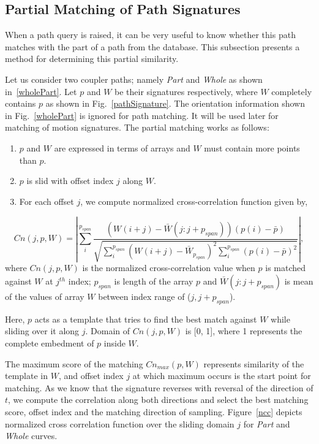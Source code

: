\documentclass[twocolumn,10pt]{asme2ej}
\begin{document}
\subsection{Partial Matching of Path Signatures}\label{sec_ncc}
When a path query is raised, it can be very useful to know whether this path matches with the part of a path from the database.
This subsection presents a method for determining this partial similarity.

Let us consider two coupler paths; namely \emph{Part} and \emph{Whole} as shown in~\ref{wholePart}.
Let $p$ and $W$ be their signatures respectively, where $W$ completely contains $p$ as shown in Fig.~\ref{pathSignature}.
The orientation information shown in Fig.~\ref{wholePart} is ignored for path matching. It will be used later for matching of motion signatures.
The partial matching works as follows:

\begin{enumerate}
  \item $p$ and $W$ are expressed in terms of arrays and $W$ must contain more points than $p$.
  \item $p$ is slid with offset index $j$ along $W$.
  \item For each offset $j$, we compute normalized cross-correlation\cite{lewis1995fast} function given by,
\end{enumerate}
\vspace{-0.6cm}
\begin{equation}\label{nccEq}
  Cn(j, p, W) = |\sum_{i}^{p_{span}} \frac{(W(i+j) - \bar{W}(j : j + p_{span}))(p(i) - \bar{p})}{\sqrt{\sum_{i}^{p_{span}}{(W(i+j) - \bar{W}_{p_{span}})}^2\sum_{i}^{p_{span}}{(p(i) - \bar{p})}^2}} |,
\end{equation}
where $Cn(j, p, W)$ is the normalized cross-correlation value when $p$ is matched against $W$ at $j^{th}$ index; $p_{span}$ is length of the array $p$ and $\bar{W}(j:j + p_{span})$ is mean of the values of array $W$ between index range of ($j, j+p_{span}$).

Here, $p$ acts as a template that tries to find the best match against $W$ while sliding over it along $j$.
Domain of $Cn(j, p, W)$ is [0, 1], where 1 represents the complete embedment of $p$ inside $W$.

The maximum score of the matching $Cn_{max}(p, W)$ represents similarity of the template in $W$, and offset index $j$ at which maximum occurs is the start point for matching.
As we know that the signature reverses with reversal of the direction of $t$, we compute the correlation along both directions and select the best matching score, offset index and the matching direction of sampling.
Figure~\ref{ncc} depicts normalized cross correlation function over the sliding domain $j$ for \emph{Part} and \emph{Whole} curves.
\end{document}
